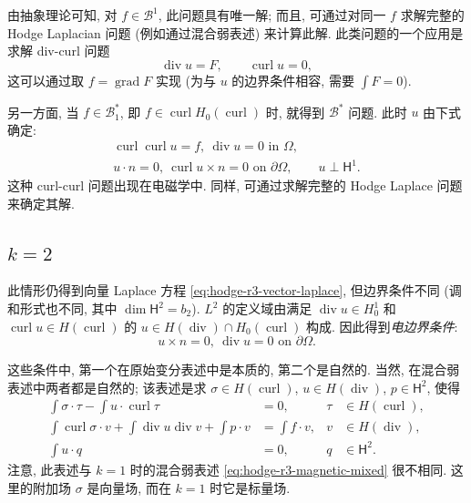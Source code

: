 由抽象理论可知, 对 $f\in\mathcal B^1$, 此问题具有唯一解; 而且, 可通过对同一 $f$ 求解完整的 Hodge Laplacian 问题 (例如通过混合弱表述) 来计算此解. 此类问题的一个应用是求解 div-curl 问题
\[
\operatorname{div}u=F,\qquad\operatorname{curl}u=0,
\]
这可以通过取 $f=\operatorname{grad}F$ 实现 (为与 $u$ 的边界条件相容, 需要 $\int F=0$).

另一方面, 当 $f\in\mathcal B_1^*$, 即 $f\in\operatorname{curl} H_{0}(\operatorname{curl})$ 时, 就得到 $\mathcal B^*$ 问题. 此时 $u$ 由下式确定:
\[
\begin{gathered}
\operatorname{curl}\operatorname{curl}u=f,\ \operatorname{div}u=0\text{ in }\Omega,\\
u\cdot n=0,\ \operatorname{curl}u\times n=0\text{ on }\partial\Omega,\qquad u\perp\mathsf H^1.
\end{gathered}
\]
这种 curl-curl 问题出现在电磁学中. 同样, 可通过求解完整的 Hodge Laplace 问题来确定其解.

\subsection{$k=2$}\label{subsec:hodge-r3-k2}

此情形仍得到向量 Laplace 方程 \eqref{eq:hodge-r3-vector-laplace}, 但边界条件不同 (调和形式也不同, 其中 $\dim\mathsf H^2=b_2$). $L^2$ 的定义域由满足 $\operatorname{div}u\in H_{0}^1$ 和 $\operatorname{curl}u\in H(\operatorname{curl})$ 的 $u\in H(\operatorname{div})\cap H_{0}(\operatorname{curl})$ 构成. 因此得到\emph{电边界条件}:
\[
u\times n=0,\ \operatorname{div}u=0\text{ on }\partial\Omega.
\]

这些条件中, 第一个在原始变分表述中是本质的, 第二个是自然的. 当然, 在混合弱表述中两者都是自然的; 该表述是求 $\sigma\in H(\operatorname{curl})$, $u\in H(\operatorname{div})$, $p\in\mathsf H^2$, 使得
\begin{equation}\label{eq:hodge-r3-electric-mixed}
\begin{aligned}
\int\sigma\cdot\tau-\int u\cdot\operatorname{curl}\tau&=0,&\tau&\in H(\operatorname{curl}),\\
\int\operatorname{curl}\sigma\cdot v+\int\operatorname{div}u\operatorname{div}v+\int p\cdot v&=\int f\cdot v,&v&\in H(\operatorname{div}),\\
\int u\cdot q&=0,&q&\in\mathsf H^2.
\end{aligned}
\end{equation}
注意, 此表述与 $k=1$ 时的混合弱表述 \eqref{eq:hodge-r3-magnetic-mixed} 很不相同. 这里的附加场 $\sigma$ 是向量场, 而在 $k=1$ 时它是标量场.

